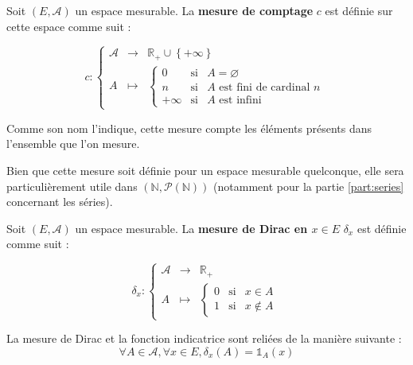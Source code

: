 \documentclass[../integ-proba.tex]{subfiles}
\begin{document}
\begin{defi}
  Soit $\left(E,\mathcal{A}\right)$ un espace mesurable.
  La \textbf{mesure de comptage} $c$ est définie sur cette espace comme suit :
  
  $$
    c : 
  \left\{
  \begin{array}{ccc}
    \mathcal{A} & \longrightarrow & \mathbb{R}_+\cup\left\{+\infty\right\}\\
    A &                                   \longmapsto    &  
      \left\{
      \begin{array}{rcl}
        0 & \text{si} & A = \varnothing\\
        n & \text{si} & A \text{ est fini de cardinal } n\\
        +\infty & \text{si} & A \text{ est infini}
      \end{array}
      \right.
  \end{array}
  \right.
  $$
\end{defi}

\begin{rem}
  Comme son nom l'indique, cette mesure compte les éléments présents dans l'ensemble que l'on mesure.
\end{rem}

\begin{rem}
  Bien que cette mesure soit définie pour un espace mesurable quelconque, elle sera particulièrement utile dans $\left(\mathbb{N},\mathcal{P}\left(\mathbb{N}\right)\right)$ (notamment pour la partie \ref{part:series} concernant les séries).
\end{rem}


\begin{defi}
  Soit $\left(E,\mathcal{A}\right)$ un espace mesurable.
  La \textbf{mesure de Dirac en $x \in E$} $\delta_x$ est définie comme suit :

  $$
    \delta_x : 
  \left\{
  \begin{array}{ccc}
    \mathcal{A} & \longrightarrow & \mathbb{R}_+\\
    A &                                   \longmapsto    &  
      \left\{
      \begin{array}{rcl}
        0 & \text{si} & x \in A\\
        1 & \text{si} & x \notin A
      \end{array}
      \right.
  \end{array}
  \right.
  $$
\end{defi}

\begin{rem}
  La mesure de Dirac et la fonction indicatrice sont reliées de la manière suivante :
  $$
  \forall A \in \mathcal{A}, \forall x \in E, \delta_x(A)=\mathds{1}_A(x)
  $$
\end{rem}
\end{document}
